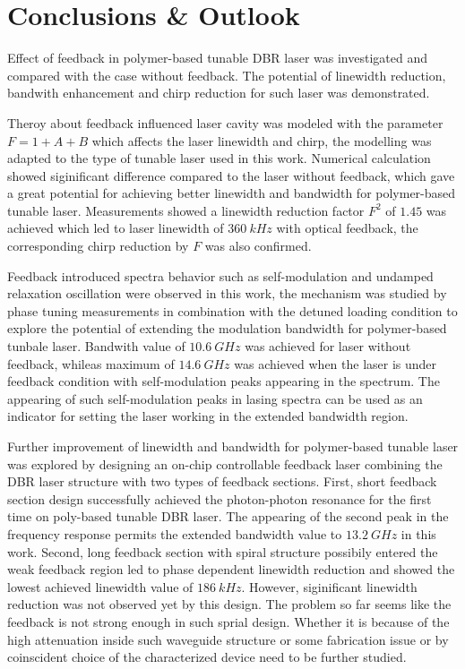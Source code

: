 
\chapter{Conclusions \& Outlook}\label{ch:Conclusion}
Effect of feedback in polymer-based tunable DBR laser was investigated and compared with the case without feedback. The potential of linewidth reduction, bandwith enhancement and chirp reduction for such laser was demonstrated.

Theroy about feedback influenced laser cavity was modeled with the parameter $F=1+A+B$ which affects the laser linewidth and chirp, the modelling was adapted to the type of tunable laser used in this work. Numerical calculation showed siginificant difference compared to the laser without feedback, which gave a great potential for achieving better linewidth and bandwidth for polymer-based tunable laser. Measurements showed a linewidth reduction factor $F^2$ of $1.45$ was achieved which led to laser linewidth of $360 \ kHz$ with optical feedback, the corresponding chirp reduction by $F$ was also confirmed.

Feedback introduced spectra behavior such as self-modulation and undamped relaxation oscillation were observed in this work, the mechanism was studied by phase tuning measurements in combination with the detuned loading condition to explore the potential of extending the modulation bandwidth for polymer-based tunbale laser. Bandwith value of $10.6 \ GHz$ was achieved for laser without feedback, whileas maximum of $14.6 \ GHz$ was achieved when the laser is under feedback condition with self-modulation peaks appearing in the spectrum. The appearing of such self-modulation peaks in lasing spectra can be used as an indicator for setting the laser working in the extended bandwidth region.

Further improvement of linewidth and bandwidth for polymer-based tunable laser was explored by designing an on-chip controllable feedback laser combining the DBR laser structure with two types of feedback sections. First, short feedback section design successfully achieved the photon-photon resonance for the first time on poly-based tunable DBR laser. The appearing of the second peak in the frequency response permits the extended bandwidth value to $13.2 \ GHz$ in this work. Second, long feedback section with spiral structure possibily entered the weak feedback region led to phase dependent linewidth reduction and showed the lowest achieved linewidth value of $186 \ kHz$. However, siginificant linewidth reduction was not observed yet by this design. The problem so far seems like the feedback is not strong enough in such sprial design. Whether it is because of the high attenuation inside such waveguide structure or some fabrication issue or by coinscident choice of the characterized device need to be further studied.

